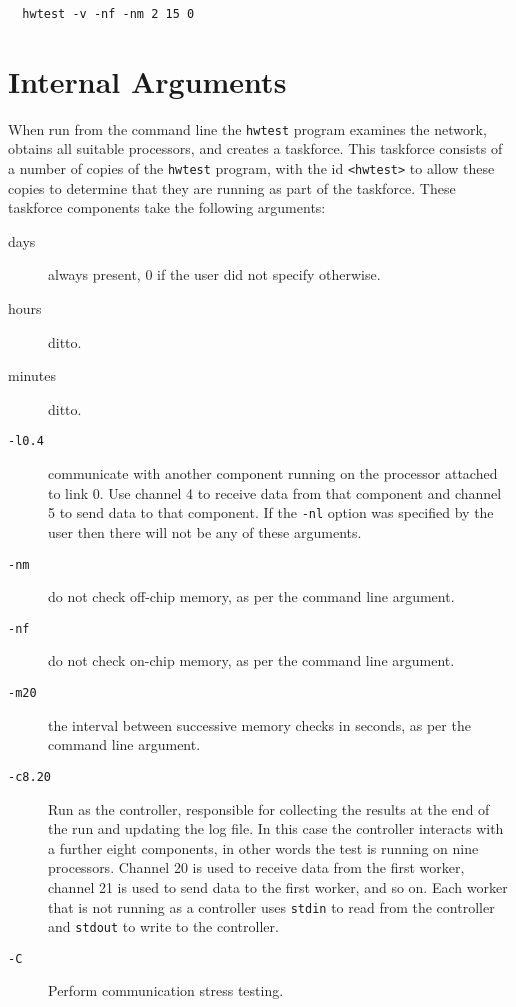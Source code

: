 \begin{verbatim}
  hwtest -v -nf -nm 2 15 0
\end{verbatim}

\section{Internal Arguments}

When run from the command line the {\tt hwtest} program examines the
network, obtains all suitable processors, and creates a taskforce.
This taskforce consists of a number of copies of the {\tt hwtest}
program, with the id \verb+<hwtest>+ to allow these copies to determine
that they are running as part of the taskforce. These taskforce components
take the following arguments:

\begin{description}
\item [days] always present, 0 if the user did not specify otherwise.
\item [hours] ditto.
\item [minutes] ditto.
\item [{\tt -l0.4}] communicate with another component running on
the processor attached to link 0. Use channel 4 to receive data from
that component and channel 5 to send data to that component. If the
{\tt -nl} option was specified by the user then there will not be any
of these arguments.
\item [{\tt -nm}] do not check off-chip memory, as per the command line
argument.
\item [{\tt -nf}] do not check on-chip memory, as per the command
line argument.
\item [{\tt -m20}] the interval between successive memory checks in
seconds, as per the command line argument.
\item [{\tt -c8.20}] Run as the controller, responsible for collecting
the results at the end of the run and updating the log file. In this
case the controller interacts with a further eight components, in other
words the test is running on nine processors. Channel 20 is used to
receive data from the first worker, channel 21 is used to send data to the
first worker, and so on. Each worker that is not running as a controller
uses {\tt stdin} to read from the controller and {\tt stdout} to write
to the controller.
\item [{\tt -C}] Perform communication stress testing.
\end{description}

